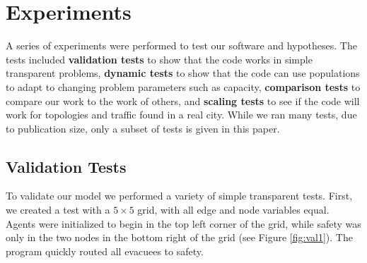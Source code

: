\documentclass{sig-alternate-05-2015}
\begin{document}
%
%
%
%
%
%
%


\section{Experiments}\label{sec:experiments}
A series of experiments were performed to test our software and
hypotheses.  The tests included \textbf{validation tests} to show that
the code works in simple transparent problems, \textbf{dynamic tests}
to show that the code can use populations to adapt to changing problem
parameters such as capacity, \textbf{comparison tests} to compare our
work to the work of others, and \textbf{scaling tests} to see if the
code will work for topologies and traffic found in a real city.  While
we ran many tests, due to publication size, only a subset of tests is
given in this paper.

\subsection{Validation Tests}
To validate our model we performed a variety of simple transparent
tests.  First, we created a test with a $5\!\times\!5$ grid, with all
edge and node variables equal.  Agents were initialized to begin in
the top left corner of the grid, while safety was only in the two
nodes in the bottom right of the grid (see Figure \ref{fig:val1}).
The program quickly routed all evacuees to safety.
\end{document}
